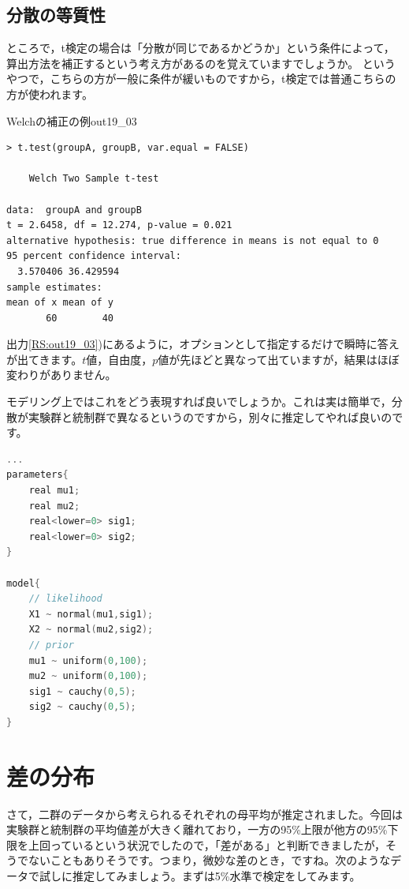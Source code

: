 \documentclass{ltjsbook}
\begin{document}
\subsection{分散の等質性}
ところで，t検定の場合は「分散が同じであるかどうか」という条件によって，算出方法を補正するという考え方があるのを覚えていますでしょうか。
というやつで，こちらの方が一般に条件が緩いものですから，t検定では普通こちらの方が使われます。
\begin{Rscreen}{Welchの補正の例}{out19_03}
    \begin{verbatim}
> t.test(groupA, groupB, var.equal = FALSE)

	Welch Two Sample t-test

data:  groupA and groupB
t = 2.6458, df = 12.274, p-value = 0.021
alternative hypothesis: true difference in means is not equal to 0
95 percent confidence interval:
  3.570406 36.429594
sample estimates:
mean of x mean of y 
       60        40 
    \end{verbatim}
\end{Rscreen}
出力\ref{RS:out19_03})にあるように，オプションとして指定するだけで瞬時に答えが出てきます。$t$値，自由度，$p$値が先ほどと異なって出ていますが，結果はほぼ変わりがありません。

モデリング上ではこれをどう表現すれば良いでしょうか。これは実は簡単で，分散が実験群と統制群で異なるというのですから，別々に推定してやれば良いのです。

\begin{lstlisting}[language=C++,label={code::19_04},caption={分散が異なる場合の推定モデル}]
        ...
parameters{
    real mu1;
    real mu2;
    real<lower=0> sig1;
    real<lower=0> sig2;
}

model{
    // likelihood
    X1 ~ normal(mu1,sig1);
    X2 ~ normal(mu2,sig2);
    // prior
    mu1 ~ uniform(0,100);
    mu2 ~ uniform(0,100);
    sig1 ~ cauchy(0,5);
    sig2 ~ cauchy(0,5);
}
\end{lstlisting}

\section{差の分布}
\label{ROPE}
さて，二群のデータから考えられるそれぞれの母平均が推定されました。今回は実験群と統制群の平均値差が大きく離れており，一方の95\%上限が他方の95\%下限を上回っているという状況でしたので，「差がある」と判断できましたが，そうでないこともありそうです。つまり，微妙な差のとき，ですね。次のようなデータで試しに推定してみましょう。まずは5\%水準で検定をしてみます。
\end{document}
